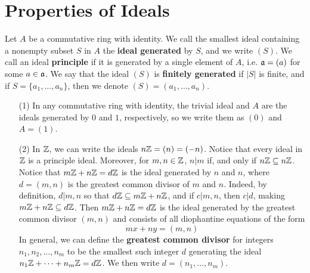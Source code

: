 \section{Properties of Ideals}

\begin{definition}
    Let $A$ be a commutative ring with identity. We call the smallest ideal
    containing a nonempty subset $S$ in $A$ the  \textbf{ideal generated} by
    $S$, and we write $(S)$. We call an ideal \textbf{principle} if it is
    generated by a single element of $A$, i.e. $\mathfrak{a}=(a)$ for some $a \in \mathfrak{a}$. We
    say that the ideal $(S)$ is \textbf{finitely generated} if $|S|$ is finite,
    and if  $S=\{a_1, \dots, a_n\}$, then we denote $(S)=(a_1, \dots, a_n)$.
\end{definition}

\begin{example}\label{1.13}
    \begin{enumerate}
        \item[(1)] In any commutative ring with identity, the trivial ideal and
            $A$ are the ideals generated by $0$ and $1$, respectively, so we
            write them as $(0)$ and $A=(1)$.

        \item[(2)] In $\mathbb{Z}$, we can write the ideals  $n\mathbb{Z}=(n)=(-n)$. Notice that
            every ideal in $\mathbb{Z}$ is a principle ideal. Moreover, for $m,n \in
            \mathbb{Z}$, $n|m$ if, and only if  $n\mathbb{Z} \subseteq n\mathbb{Z}$. Notice that
            $m\mathbb{Z}+n\mathbb{Z}=d\mathbb{Z}$ is the ideal generated by $n$ and $n$, where $d=(m,n)$
            is the greatest common divisor of $m$ and  $n$. Indeed, by
            definition, $d|m,n$ so that $d\mathbb{Z} \subseteq m\mathbb{Z}+n\mathbb{Z}$, and if
            $c|m,n$, then  $c|d$, making  $m\mathbb{Z}+n\mathbb{Z} \subseteq d\mathbb{Z}$. Then
            $m\mathbb{Z}+n\mathbb{Z}=d\mathbb{Z}$ is the ideal generated by the greatest common divisor
             $(m,n)$ and consists of all diophantine equations of the form
             \begin{equation*}
                 mx+ny=(m,n)
             \end{equation*}
             In general, we can define the \textbf{greatest common divisor} for
             integers $n_1, n_2, \dots, n_m$ to be the smallest such integer $d$
             generating the ideal $n_1\mathbb{Z}+\dots+n_m\mathbb{Z}=d\mathbb{Z}$. We then write
             $d=(n_1, \dots, n_m)$.


\end{enumerate}
\end{example}
